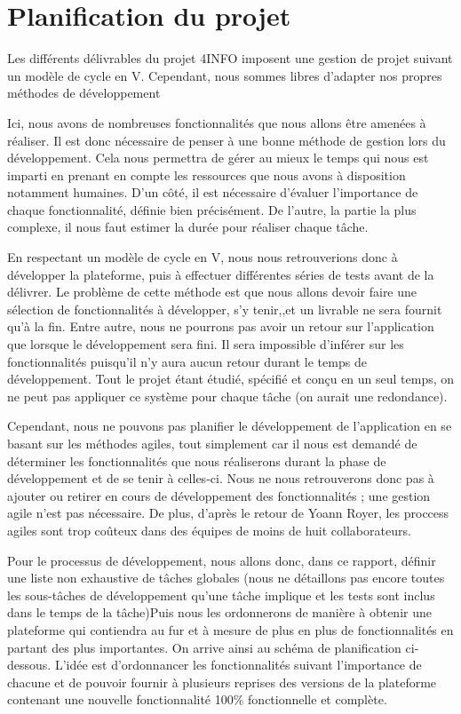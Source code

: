 \section{Planification du projet}
\label{sec:orga}

	Les différents délivrables du projet 4INFO imposent une gestion de projet suivant un modèle de cycle en V. Cependant, nous sommes libres d'adapter nos propres méthodes de développement 

	Ici, nous avons de nombreuses fonctionnalités que nous allons être amenées à réaliser. Il est donc nécessaire de penser à une bonne méthode de gestion lors du développement. Cela nous permettra de gérer au mieux le temps qui nous est imparti en prenant en compte les ressources que nous avons à disposition notamment humaines. D'un côté, il est nécessaire d'évaluer l'importance de chaque fonctionnalité, définie bien précisément. De l'autre, la partie la plus complexe, il nous faut estimer la durée pour réaliser chaque tâche.

	En respectant un modèle de cycle en V, nous nous retrouverions donc à développer la plateforme, puis à effectuer différentes séries de tests avant de la délivrer. Le problème de cette méthode est que nous allons devoir faire une sélection de fonctionnalités à développer, s'y tenir,,et un livrable ne sera fournit qu'à la fin. Entre autre, nous ne pourrons pas avoir un retour sur l'application que lorsque le développement sera fini. Il sera impossible d'inférer sur les fonctionnalités puisqu'il n'y aura aucun retour durant le temps de développement. Tout le projet étant étudié, spécifié et conçu en un seul temps, on ne peut pas appliquer ce système pour chaque tâche (on aurait une redondance).

	Cependant, nous ne pouvons pas planifier le développement de l'application en se basant sur les méthodes agiles, tout simplement car il nous est demandé de déterminer les fonctionnalités que nous réaliserons durant la phase de développement et de se tenir à celles-ci. Nous ne nous retrouverons donc pas à ajouter ou retirer en cours de développement des fonctionnalités ; une gestion agile n'est pas nécessaire. De plus, d'après le retour de Yoann Royer, les proccess agiles sont trop coûteux dans des équipes de moins de huit collaborateurs.

	Pour le processus de développement, nous allons donc, dans ce rapport, définir une liste non exhaustive de tâches globales (nous ne détaillons pas encore toutes les sous-tâches de développement qu'une tâche implique et les tests sont inclus dans le temps de la tâche)Puis nous les ordonnerons de manière à obtenir une plateforme qui contiendra au fur et à mesure de plus en plus de fonctionnalités en partant des plus importantes. On arrive ainsi au schéma de planification ci-dessous. L'idée est d'ordonnancer les fonctionnalités suivant l'importance de chacune et de pouvoir fournir à plusieurs reprises des versions de la plateforme contenant une nouvelle fonctionnalité 100\% fonctionnelle et complète.


